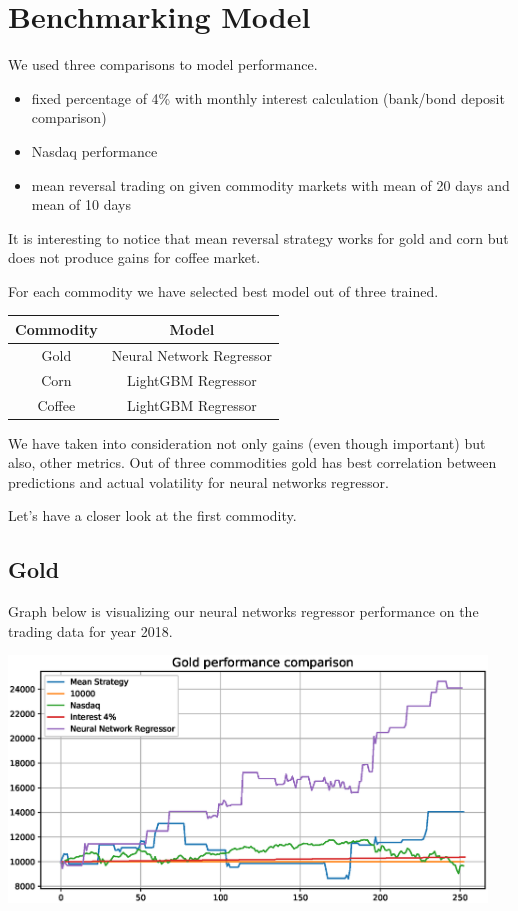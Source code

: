 \documentclass[final,2p]{elsarticle}
\begin{document}
\section{Benchmarking Model}

We used three comparisons to model performance.

\begin{itemize}
    \item fixed percentage of 4\% with monthly interest calculation (bank/bond deposit comparison)
    \item Nasdaq performance
    \item mean reversal trading on given commodity markets with mean of 20 days and mean of 10 days
\end{itemize}

It is interesting to notice that mean reversal strategy works for gold and corn but does not produce gains for coffee market.

For each commodity we have selected best model out of three trained.
\begin{center}
    \begin{tabular}{cc}
        Commodity & Model \\
        \hline
        Gold & Neural Network Regressor\\
        Corn & LightGBM Regressor\\
        Coffee & LightGBM Regressor\\
    \end{tabular}
\end{center}

We have taken into consideration not only gains (even though important) but also, other metrics.
Out of three commodities gold has best correlation between predictions and actual volatility for neural networks regressor.

Let's have a closer look at the first commodity.

\subsection{Gold}

Graph below is visualizing our neural networks regressor performance on the trading data for year 2018.

\begin{center}
\includegraphics[width = 5in]{figures/gold_benchmark_performance.eps}
\end{center}
\end{document}

